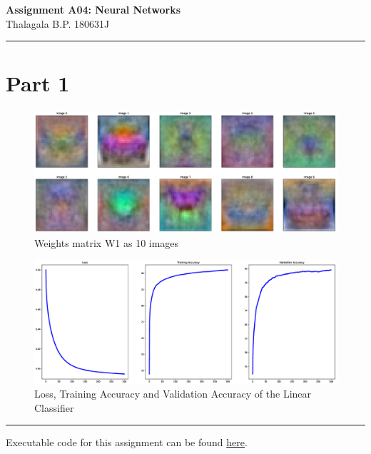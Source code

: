 \documentclass[a4paper,11pt]{article}%
\begin{document}
	\begin{center}
		{\large \textbf{Assignment A04: Neural Networks}}\\
		Thalagala B.P.\hspace{0.5cm} 180631J 
	\end{center}
	\hrule

\section{Part 1}

\begin{figure}[!h]
	\centering
	\includegraphics[scale=0.3]{figures/trainedWeights}
	\caption{Weights matrix W1 as 10 images}
\end{figure}

\begin{figure}[!h]
	\centering
	\includegraphics[scale=0.3]{figures/part1plots}
	\caption{Loss, Training Accuracy and Validation Accuracy of the Linear Classifier}
\end{figure}

\vfill
\hrule
\begin{center}
	Executable code for this assignment can be found  \href{https://github.com/bimalka98/Computer-Vision-and-Image-Processing/blob/main/EN2550Assignments/A4/180631J_a04.ipynb}{here}.
\end{center}
  
\end{document}
